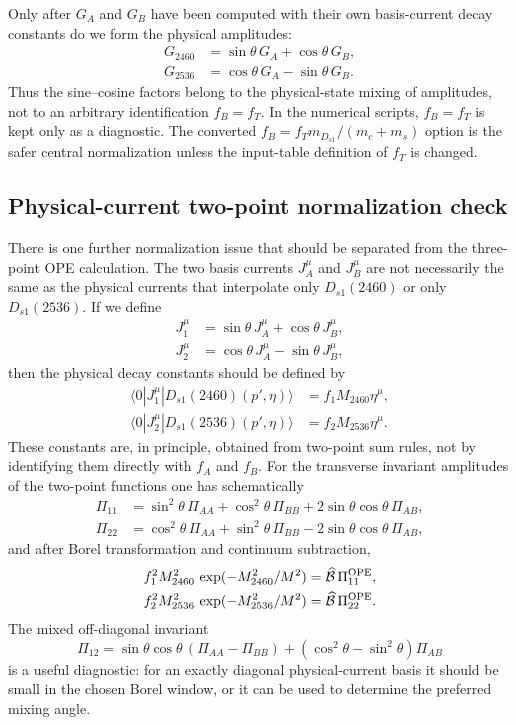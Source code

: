 \documentclass[11pt]{article}
\newcommand{\Dsone}{D_{s1}}
\begin{document}
Only after $G_A$ and $G_B$ have been computed with their own basis-current
decay constants do we form the physical amplitudes:
\begin{align}
  G_{2460}
  &=
  \sin\theta\,G_A+\cos\theta\,G_B,\\
  G_{2536}
  &=
  \cos\theta\,G_A-\sin\theta\,G_B.
\end{align}
Thus the sine--cosine factors belong to the physical-state mixing of amplitudes,
not to an arbitrary identification $f_B=f_T$.  In the numerical scripts,
$f_B=f_T$ is kept only as a diagnostic.  The converted
$f_B=f_T m_{D_{s1}}/(m_c+m_s)$ option is the safer central normalization unless
the input-table definition of $f_T$ is changed.

\subsection{Physical-current two-point normalization check}

There is one further normalization issue that should be separated from the
three-point OPE calculation.  The two basis currents $J_A^\mu$ and $J_B^\mu$
are not necessarily the same as the physical currents that interpolate only
$\Dsone(2460)$ or only $\Dsone(2536)$.  If we define
\begin{align}
  J_1^\mu &= \sin\theta\,J_A^\mu+\cos\theta\,J_B^\mu,\\
  J_2^\mu &= \cos\theta\,J_A^\mu-\sin\theta\,J_B^\mu,
\end{align}
then the physical decay constants should be defined by
\begin{align}
  \langle0|J_1^\mu|\Dsone(2460)(p',\eta)\rangle
  &= f_1 M_{2460}\eta^\mu,\\
  \langle0|J_2^\mu|\Dsone(2536)(p',\eta)\rangle
  &= f_2 M_{2536}\eta^\mu .
\end{align}
These constants are, in principle, obtained from two-point sum rules, not by
identifying them directly with $f_A$ and $f_B$.  For the transverse invariant
amplitudes of the two-point functions one has schematically
\begin{align}
  \Pi_{11}
  &= \sin^2\theta\,\Pi_{AA}
     +\cos^2\theta\,\Pi_{BB}
     +2\sin\theta\cos\theta\,\Pi_{AB},\\
  \Pi_{22}
  &= \cos^2\theta\,\Pi_{AA}
     +\sin^2\theta\,\Pi_{BB}
     -2\sin\theta\cos\theta\,\Pi_{AB},
\end{align}
and after Borel transformation and continuum subtraction,
\begin{align}
  f_1^2 M_{2460}^2\,\exp(-M_{2460}^2/M^2)
  &=
  \widehat{\mathcal B}\,\Pi_{11}^{\rm OPE},\\
  f_2^2 M_{2536}^2\,\exp(-M_{2536}^2/M^2)
  &=
  \widehat{\mathcal B}\,\Pi_{22}^{\rm OPE}.
\end{align}
The mixed off-diagonal invariant
\begin{equation}
  \Pi_{12}
  =\sin\theta\cos\theta\,(\Pi_{AA}-\Pi_{BB})
   +(\cos^2\theta-\sin^2\theta)\Pi_{AB}
\end{equation}
is a useful diagnostic: for an exactly diagonal physical-current basis it
should be small in the chosen Borel window, or it can be used to determine the
preferred mixing angle.
\end{document}
